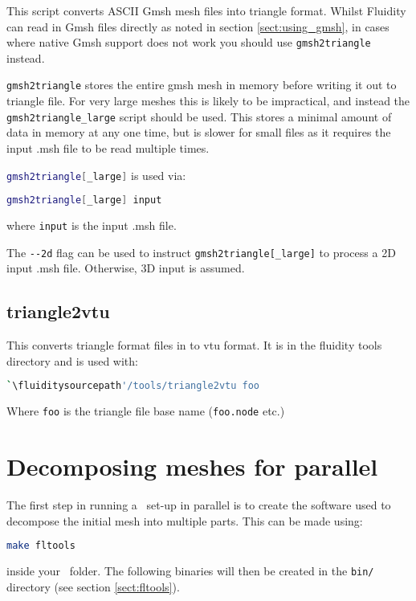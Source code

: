 This script converts ASCII Gmsh mesh files into triangle format. Whilst Fluidity
can read in Gmsh files directly as noted in section \ref{sect:using_gmsh}, in
cases where native Gmsh support does not work you should use 
\lstinline[language = Bash]+gmsh2triangle+ instead.


\lstinline[language=Bash]{gmsh2triangle} stores the entire gmsh mesh in memory before writing it out to
triangle file. For very large meshes this is likely to be impractical,
and instead the \lstinline[language=Bash]{gmsh2triangle_large} script
should be used. This stores a minimal amount of data in memory at 
any one time, but is slower for small files as it requires the 
input .msh file to be read multiple times.

\lstinline[language=Bash]{gmsh2triangle[_large]} is used via:

\begin{lstlisting}[language = Bash]
gmsh2triangle[_large] input
\end{lstlisting}

where \lstinline[language = Bash]*input* is the input .msh file.

The \lstinline[language = Bash]+--2d+ flag can be used to instruct \lstinline+gmsh2triangle[_large]+
to process a 2D input .msh file. Otherwise, 3D input is assumed.

\subsection{triangle2vtu}
This converts triangle format files in to vtu format. It is in the fluidity tools directory and is used with:

\begin{lstlisting}[language = Bash]
`\fluiditysourcepath'/tools/triangle2vtu foo
\end{lstlisting}

Where \lstinline+foo+ is the triangle file base name (\lstinline+foo.node+ etc.)

\section{Decomposing meshes for parallel}
\label{decomp_meshes_parallel}

The first step in running a \fluidity\ set-up in parallel is to create the software
used to decompose the initial mesh into multiple parts. This can be made using:
\begin{lstlisting}[language=bash]
make fltools
\end{lstlisting}
inside your \fluidity\ folder. The following binaries will then be created in the \lstinline+bin/+ directory (see section \ref{sect:fltools}).



